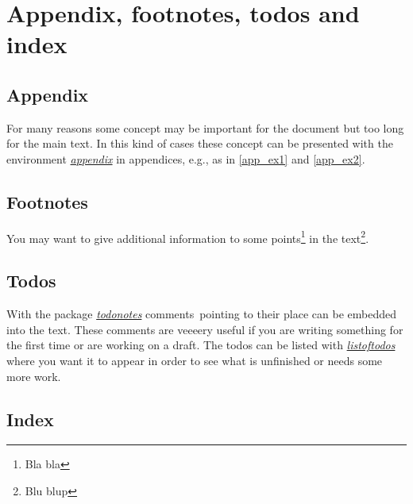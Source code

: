 \documentclass[a4paper,11pt,oneside]{book}
\newcommand{\imp}[1]{\underline{\textit{#1}}}
\begin{document}
\chapter{Appendix, footnotes, todos and index}


\section{Appendix}

For many reasons some concept may be important for the document but too long for the main text. In this kind of cases these concept can be presented with the environment \imp{appendix} in appendices, e.g., as in \autoref{app_ex1} and \autoref{app_ex2}.


\section{Footnotes}

You may want to give additional information to some points\footnote{Bla bla} in the text\footnote{Blu blup}.


\section{Todos}

With the package \imp{todonotes} comments\ pointing to their place can be embedded into the text. These comments are veeeery useful if you are writing something for the first time or are working on a draft. The todos can be listed with \imp{listoftodos} where you want it to appear in order to see what is unfinished or needs some more work.


\section{Index}
\end{document}
